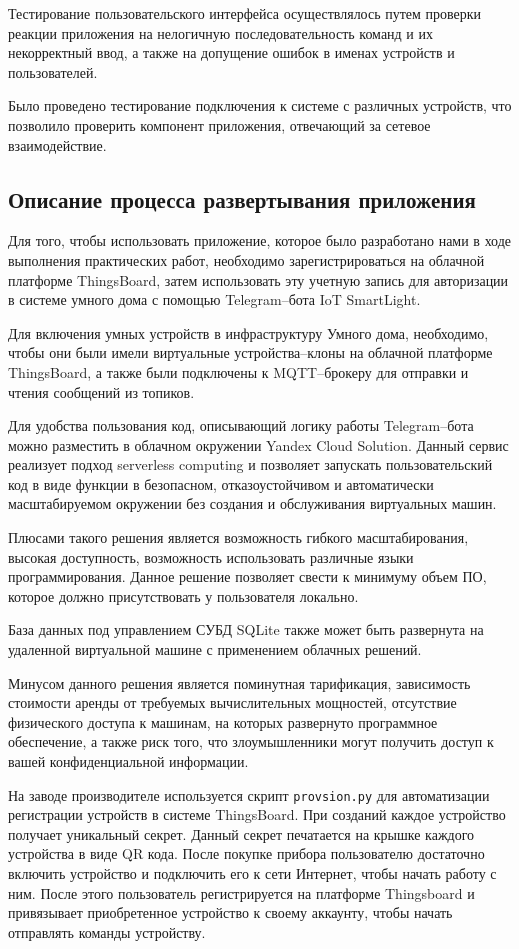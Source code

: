 \documentclass[a4paper,14pt]{extarticle}
\begin{document}
Тестирование пользовательского интерфейса осуществлялось путем проверки реакции приложения на нелогичную последовательность команд и их некорректный ввод, а также на допущение ошибок в именах устройств и пользователей. 

Было проведено тестирование подключения к системе с различных устройств, что позволило проверить компонент приложения, отвечающий за сетевое взаимодействие.

\subsection{Описание процесса развертывания приложения}

Для того, чтобы использовать приложение, которое было разработано нами в ходе выполнения практических работ, необходимо зарегистрироваться на  облачной платформе ThingsBoard, затем использовать эту учетную запись для авторизации в системе умного дома с помощью \mbox{Telegram--бота} IoT SmartLight. 

Для включения умных устройств в инфраструктуру Умного дома, необходимо, чтобы они были имели виртуальные \mbox{устройства--клоны} на облачной платформе ThingsBoard, а также были подключены к \mbox{MQTT--брокеру} для отправки и чтения сообщений из топиков.

Для удобства пользования код, описывающий логику работы \mbox{Telegram--бота} можно разместить в облачном окружении Yandex Cloud Solution. Данный сервис реализует подход serverless computing и позволяет запускать пользовательский код в виде функции в безопасном, отказоустойчивом и автоматически масштабируемом окружении без создания и обслуживания виртуальных машин.

Плюсами такого решения является возможность гибкого масштабирования, высокая доступность, возможность использовать различные языки программирования. Данное решение позволяет свести к минимуму объем ПО, которое должно присутствовать у пользователя локально.

База данных под управлением СУБД SQLite также может быть развернута на удаленной виртуальной машине с применением облачных решений. 

Минусом данного решения является поминутная тарификация, зависимость стоимости аренды от требуемых вычислительных мощностей, отсутствие физического доступа к машинам, на которых развернуто программное обеспечение, а также риск того, что злоумышленники могут получить доступ к вашей конфиденциальной информации.  

На заводе производителе используется скрипт \texttt{provsion.py} для автоматизации регистрации устройств в системе ThingsBoard. При созданий каждое устройство получает уникальный секрет. Данный секрет печатается на крышке каждого устройства в виде QR кода. После покупке прибора пользователю достаточно включить устройство и подключить его к сети Интернет, чтобы начать работу с ним. После этого пользователь регистрируется на платформе Thingsboard и привязывает приобретенное устройство к своему аккаунту, чтобы начать отправлять команды устройству.
\end{document}
